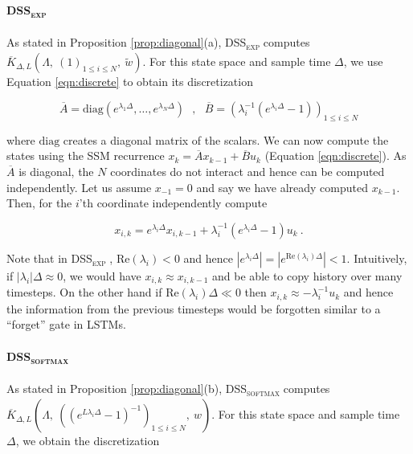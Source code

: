 \paragraph{\textsc{DSS}\textsubscript{\textsc{exp}} } As stated in Proposition \ref{prop:diagonal}(a), \textsc{DSS}\textsubscript{\textsc{exp}}  computes $\overline{K}_{\Delta, L}(\Lambda,\ (1)_{1 \leq i \leq N},\ \widetilde{w})$. For this state space and sample time $\Delta$, we use Equation \ref{eqn:discrete} to obtain its discretization

\begin{equation*}
\overline{A} = \mathrm{diag}(e^{\lambda_1\Delta}, \ldots, e^{\lambda_N\Delta}) \ \ \ , \ \ \ \overline{B} = \left( \lambda_i^{-1} (e^{\lambda_i\Delta} - 1) \right)_{1\leq i \leq N} 
\end{equation*}

where $\mathrm{diag}$ creates a diagonal matrix of the scalars. We can now compute the states using the SSM recurrence $x_{k} = \overline{A} x_{k-1} + \overline{B}u_k$ (Equation \ref{eqn:discrete}).
As $\overline{A}$ is diagonal, the $N$ coordinates do not interact and hence can be computed independently. Let us assume $x_{-1} = 0$ and say we have already computed $x_{k-1}$. Then, for the $i$'th coordinate independently compute

\begin{equation*}
x_{i,k} = e^{\lambda_i\Delta} x_{i,k-1} + \lambda_i^{-1} (e^{\lambda_i\Delta} - 1)u_k \ .
\end{equation*}

Note that in \textsc{DSS}\textsubscript{\textsc{exp}}  , $\mathrm{Re}(\lambda_i) < 0$ and hence $|e^{\lambda_i\Delta}| = |e^{\mathrm{Re}(\lambda_i)\Delta}| < 1$. Intuitively, if $|\lambda_i|\Delta \approx 0$, we would have $x_{i,k} \approx x_{i,k-1}$ and be able to copy history over many timesteps. On the other hand if $\mathrm{Re}(\lambda_i)\Delta \ll 0$ then $x_{i,k} \approx -\lambda_i^{-1}u_k$ and hence the information from the previous timesteps would be forgotten similar to a ``forget'' gate in LSTMs. 

\paragraph{\textsc{DSS}\textsubscript{\textsc{softmax}} } As stated in Proposition \ref{prop:diagonal}(b), \textsc{DSS}\textsubscript{\textsc{softmax}}  computes $\overline{K}_{\Delta, L}(\Lambda,\ ((e^{L\lambda_i\Delta} - 1)^{-1})_{1\leq i \leq N},\ w)$. For this state space and sample time $\Delta$, we obtain the discretization

